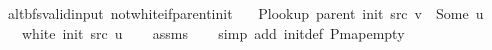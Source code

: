 \begin{isabellebody}
%
\endisatagdocument
{\isafolddocument}%
%
\isadelimdocument
%
\endisadelimdocument
{}\isamarkupfalse%
\ {\isacharparenleft}{\kern0pt}\ alt{\isacharunderscore}{\kern0pt}bfs{\isacharunderscore}{\kern0pt}valid{\isacharunderscore}{\kern0pt}input{\isacharparenright}{\kern0pt}\ not{\isacharunderscore}{\kern0pt}white{\isacharunderscore}{\kern0pt}if{\isacharunderscore}{\kern0pt}parent{\isacharunderscore}{\kern0pt}init{\isacharcolon}{\kern0pt}\isanewline
\ \ \ {\isachardoublequoteopen}P{\isacharunderscore}{\kern0pt}lookup\ {\isacharparenleft}{\kern0pt}parent\ {\isacharparenleft}{\kern0pt}init\ src{\isacharparenright}{\kern0pt}{\isacharparenright}{\kern0pt}\ v\ {\isacharequal}{\kern0pt}\ Some\ u{\isachardoublequoteclose}\isanewline
\ \ \ {\isachardoublequoteopen}{\isasymnot}\ white\ {\isacharparenleft}{\kern0pt}init\ src{\isacharparenright}{\kern0pt}\ u{\isachardoublequoteclose}\isanewline
%
\isadelimproof
\ \ %
\endisadelimproof
%
\isatagproof
{}\isamarkupfalse%
\ assms\isanewline
\ \ \isamarkupfalse%
\ {\isacharparenleft}{\kern0pt}simp\ add{\isacharcolon}{\kern0pt}\ init{\isacharunderscore}{\kern0pt}def\ P{\isachardot}{\kern0pt}map{\isacharunderscore}{\kern0pt}empty{\isacharparenright}{\kern0pt}%
\endisatagproof
{\isafoldproof}%
%
\isadelimproof
%
\endisadelimproof
%
\isadelimdocument
%
\endisadelimdocument
%
\isatagdocument
%

\end{isabellebody}
